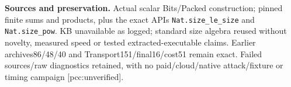 \documentclass[10pt]{article}
\begin{document}
\textbf{Sources and preservation.} Actual scalar Bits/Packed construction;
pinned finite sums and products, plus the exact APIs
\texttt{Nat.size\_le\_size} and \texttt{Nat.size\_pow}.
KB unavailable as logged; standard size algebra reused without novelty,
measured speed or tested extracted-executable claims. Earlier archives86/48/40
and Transport151/final16/cost51 remain exact. Failed sources/raw diagnostics
retained, with no paid/cloud/native attack/fixture or timing campaign
[pcc:unverified].
\end{document}
